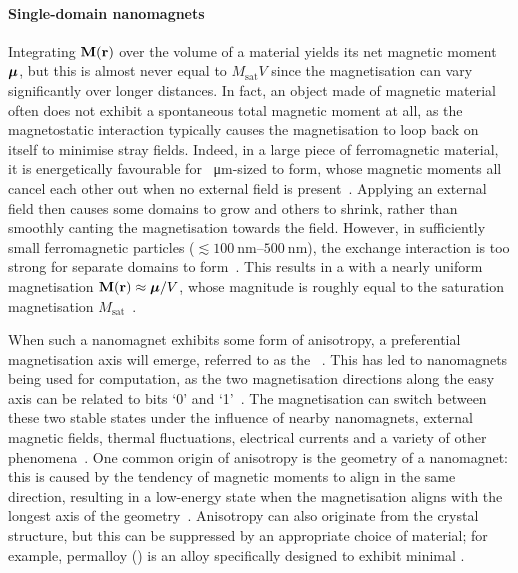 \paragraph{Single-domain nanomagnets}
Integrating $\boldsymbol{\mathbf{M}}(\boldsymbol{\mathbf{r}})$ over the volume of a material yields its net magnetic moment $\boldsymbol{\mathbf{\mu}}$, but this is almost never equal to $M_\mathrm{sat}V$ since the magnetisation can vary significantly over longer distances.
In fact, an object made of magnetic material often does not exhibit a spontaneous total magnetic moment at all, as the magnetostatic interaction typically causes the magnetisation to loop back on itself to minimise stray fields.
Indeed, in a large piece of ferromagnetic material, it is energetically favourable for \SI{}{\micro\metre}-sized  to form, whose magnetic moments all cancel each other out when no external field is present~\cite{coey2010magnetism}.
Applying an external field then causes some domains to grow and others to shrink, rather than smoothly canting the magnetisation towards the field.
However, in sufficiently small ferromagnetic particles ($\lesssim \SIrange{100}{500}{\nano\metre}$), the exchange interaction is too strong for separate domains to form~\cite{Kittel_TheoryFMDomains,BrownThermalFluctuations}.
This results in a  with a nearly uniform magnetisation $\boldsymbol{\mathbf{M}}(\boldsymbol{\mathbf{r}}) \approx \boldsymbol{\mathbf{\mu}}/V$, whose magnitude is roughly equal to the saturation magnetisation $M_\mathrm{sat}$~\cite{FRENKEL1930,neel1949theorie}. \par %
When such a nanomagnet exhibits some form of anisotropy, a preferential magnetisation axis will emerge, referred to as the ~\cite{nisoli2013colloquium}.
This has led to nanomagnets being used for computation, as the two magnetisation directions along the easy axis can be related to bits `0' and `1'~\cite{MQCA_RoomTemp,NML_Carlton,Gypens_Balanced,Gypens_SelfOrganizing,JM_Masterproef}.
The magnetisation can switch between these two stable states under the influence of nearby nanomagnets, external magnetic fields, thermal fluctuations, electrical currents and a variety of other phenomena~\cite{SwitchingForced_EnergyEfficient,BrownThermalFluctuations,neel1949theorie}.
One common origin of anisotropy is the geometry of a nanomagnet: this  is caused by the tendency of magnetic moments to align in the same direction, resulting in a low-energy state when the magnetisation aligns with the longest axis of the geometry~\cite{MagneticCharge}.
Anisotropy can also originate from the crystal structure, but this can be suppressed by an appropriate choice of material; for example, permalloy () is an alloy specifically designed to exhibit minimal .

